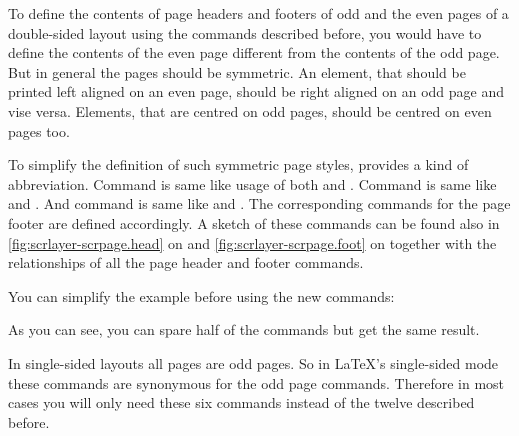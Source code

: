 \begin{Declaration}
\end{Declaration}
To define the contents of page headers and footers of odd and the even pages
of a double-sided layout using the commands described before, you would have to
define the contents of the even page different from the contents of the odd
page. But in general the pages should be symmetric. An element, that should be
printed left aligned on an even page, should be right aligned on an odd page
and vise versa. Elements, that are centred on odd pages, should be centred on
even pages too.

To simplify the definition of such symmetric page styles,
 provides a kind of abbreviation. Command
 is same like usage of both  and
. Command  is same like  and
. And command  is same like  and
. The corresponding commands for the page footer are defined
accordingly. A sketch of these commands can be found also in
\autoref{fig:scrlayer-scrpage.head} on 
and \autoref{fig:scrlayer-scrpage.foot} on
 together with the relationships of all
the page header and footer commands.
%
\begin{Example}
  You can simplify the example before using the new commands:
  As you can see, you can spare half of the commands but get the same result.
\end{Example}
%
In single-sided layouts all pages are odd pages. So in LaTeX's single-sided
mode these commands are synonymous for the odd page commands. Therefore in
most cases you will only need these six commands instead of the twelve
described before.


